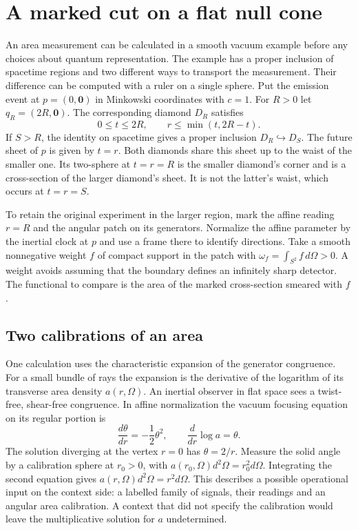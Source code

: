 \documentclass[11pt,letterpaper]{article}
\begin{document}
\section{A marked cut on a flat null cone}
\label{sec:flat}
An area measurement can be calculated in a smooth vacuum example before
any choices about quantum representation. The example has a proper
inclusion of spacetime regions and two different ways to transport the
measurement. Their difference can be computed with a ruler on a single
sphere. Put the emission event at \(p=(0,\mathbf 0)\) in Minkowski
coordinates with \(c=1\). For \(R>0\) let \(q_R=(2R,\mathbf 0)\).
The corresponding diamond \(D_R\) satisfies
\[
 0\le t\le2R,\qquad r\le\min(t,2R-t).
\]
If \(S>R\), the identity on spacetime gives a proper inclusion
\(D_R\hookrightarrow D_S\). The future sheet of \(p\) is given by \(t=r\). Both diamonds
share this sheet up to the waist of the smaller one. Its two-sphere at
\(t=r=R\) is the smaller diamond's corner and is a cross-section of the
larger diamond's sheet. It is not the latter's waist, which occurs at
\(t=r=S\).

To retain the original experiment in the larger region, mark the affine
reading \(r=R\) and the angular patch on its generators. Normalize the
affine parameter by the inertial clock at \(p\) and use a frame there
to identify directions. Take a smooth nonnegative weight \(f\) of
compact support in the patch with
\(\omega_f=\int_{S^2}f\,d\Omega>0\). A weight avoids assuming that the
boundary defines an infinitely sharp detector. The functional to compare
is the area of the marked cross-section smeared with \(f\).

\subsection{Two calibrations of an area}
One calculation uses the characteristic expansion of the generator
congruence. For a small bundle of rays the expansion is the derivative
of the logarithm of its transverse area density \(a(r,\Omega)\).
An inertial observer in flat space sees a twist-free, shear-free
congruence. In affine normalization the vacuum focusing equation
on its regular portion is
\[
 \frac{d\theta}{dr}=-\frac12\theta^2,\qquad
 \frac{d}{dr}\log a=\theta .
\]
The solution diverging at the vertex \(r=0\) has \(\theta=2/r\).
Measure the solid angle by a calibration sphere at \(r_0>0\), with
\(a(r_0,\Omega)d^2\Omega=r_0^2d\Omega\). Integrating the second equation
gives \(a(r,\Omega)d^2\Omega=r^2d\Omega\). This describes a possible
operational input on the context side: a labelled family of signals,
their readings and an angular area calibration. A context that did not
specify the calibration would leave the multiplicative solution for
\(a\) undetermined.
\end{document}
